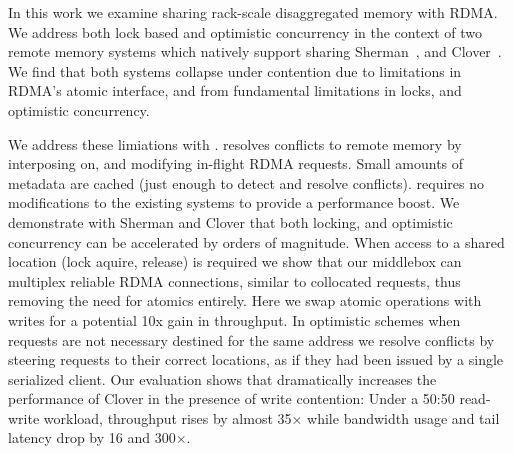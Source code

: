 In this work we examine sharing rack-scale disaggregated
memory with RDMA. We address both lock based and optimistic
concurrency in the context of two remote memory systems
which natively support sharing Sherman~\cite{sherman}, and
Clover~\cite{clover}. We find that both systems collapse
under contention due to limitations in RDMA's atomic
interface, and from fundamental limitations in locks, and
optimistic concurrency. 

We address these limiations with \sword. {\sword} resolves
conflicts to remote memory by interposing on, and modifying
in-flight RDMA requests. Small amounts of metadata are
cached (just enough to detect and resolve conflicts). \sword
requires no modifications to the existing systems to
provide a performance boost.  We demonstrate with Sherman
and Clover that both locking, and optimistic concurrency can
be accelerated by orders of magnitude. 
When access to a shared location (lock aquire, release) is
required we show that our middlebox can multiplex reliable
RDMA connections, similar to collocated requests, thus
removing the need for atomics entirely. Here we swap atomic
operations with writes for a potential 10x gain in
throughput. In optimistic schemes when requests are not
necessary destined for the same address we resolve conflicts
by steering requests to their correct locations, as if they
had been issued by a single serialized client.
Our evaluation shows that {\sword} dramatically increases
the performance of Clover in the presence of write
contention: Under a 50:50 read-write workload, throughput
rises by almost 35$\times$ while bandwidth usage and tail
latency drop by 16 and 300$\times$.



